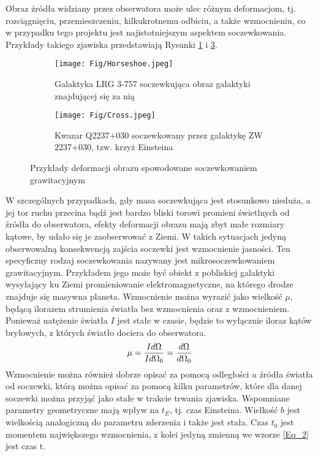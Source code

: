 \documentclass[a4paper,11pt]{article}
\newcommand{\ak}{\hspace{0.7 cm}}
\begin{document}
\ak Obraz źródła widziany przez obserwatora może ulec różnym deformacjom, tj. rozciągnięciu, przemieszczeniu, kilkukrotnemu odbiciu, a także wzmocnieniu, co w przypadku tego projektu jest najistotniejszym aspektem soczewkowania. Przykłady takiego zjawiska przedstawiają Rysunki \ref{Fig_2} i \ref{Fig_3}.
\newpage%
\begin{figure}[h]
\begin{subfigure}{0.5\textwidth}
\centering
\texttt{[image: Fig/Horseshoe.jpeg]}
\caption{Galaktyka LRG 3-757 soczewkująca obraz galaktyki znajdującej się za nią \citet{Horseshoe}}
\label{Fig_2}
\end{subfigure}
\hspace{0.5cm}
\begin{subfigure}{0.5\textwidth}
\centering
\texttt{[image: Fig/Cross.jpeg]}
\caption{Kwazar Q2237+030 soczewkowany przez galaktykę ZW 2237+030, tzw. krzyż Einsteina \citet{Cross}}
\label{Fig_3}
\end{subfigure}
\caption{Przykłady deformacji obrazu spowodowane soczewkowaniem grawitacyjnym}
\end{figure}
\ak W szczególnych przypadkach, gdy masa soczewkująca jest stosunkowo nieduża, a jej tor ruchu przecina bądź jest bardzo bliski torowi promieni świetlnych od źródła do obserwatora, efekty deformacji obrazu mają zbyt małe rozmiary kątowe, by udało się je zaobserwować z Ziemi. W takich sytuacjach jedyną obserwowalną konsekwencją zajścia soczewki jest wzmocnienie jasności. Ten specyficzny rodzaj soczewkowania nazywany jest mikrosoczewkowaniem grawitacyjnym. Przykładem jego może być obiekt z pobliskiej galaktyki wysyłający ku Ziemi promieniowanie elektromagnetyczne, na którego drodze znajduje się masywna planeta. Wzmocnienie można wyrazić jako wielkość $\mu$, będącą ilorazem strumienia światła bez wzmocnienia oraz z wzmocnieniem. Ponieważ natężenie światła $I$ jest stałe w czasie, będzie to wyłącznie iloraz kątów bryłowych, z których światło dociera do  obserwatora.\\
\begin{equation}
\centering
\mu=\frac{Id\Omega}{Id\Omega_{0}}=\frac{d\Omega}{d\Omega_{0}}
\label{Eq_1}
\end{equation}
\flushleft
\ak Wzmocnienie można również dobrze opisać za pomocą odległości $u$ źródła światła od soczewki, którą można opisać za pomocą kilku parametrów, które dla danej soczewki można przyjąć jako stałe w trakcie trwania zjawiska. Wspomniane parametry geometryczne mają wpływ na $t_{E}$, tj. czas Einsteina. Wielkość $b$ jest wielkością analogiczną do parametru zderzenia i także jest stała. Czas $t_{0}$ jest momentem największego wzmocnienia, z kolei jedyną zmienną we wzorze \ref{Eq_2} jest czas {t}.
\end{document}
